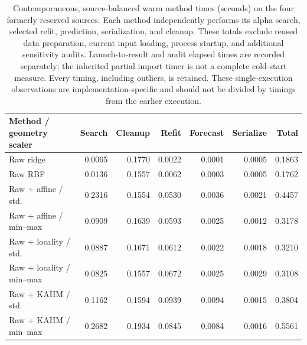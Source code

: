 \begin{table}[!htbp]
\centering
\scriptsize
\begin{tabular}{lrrrrrr}
\toprule
Method / geometry scaler & Search & Cleanup & Refit & Forecast & Serialize & Total \\
\midrule
Raw ridge & 0.0065 & 0.1770 & 0.0022 & 0.0001 & 0.0005 & 0.1863 \\
Raw RBF & 0.0136 & 0.1557 & 0.0062 & 0.0003 & 0.0005 & 0.1762 \\
Raw + affine / std. & 0.2316 & 0.1554 & 0.0530 & 0.0036 & 0.0021 & 0.4457 \\
Raw + affine / min--max & 0.0909 & 0.1639 & 0.0593 & 0.0025 & 0.0012 & 0.3178 \\
Raw + locality / std. & 0.0887 & 0.1671 & 0.0612 & 0.0022 & 0.0018 & 0.3210 \\
Raw + locality / min--max & 0.0825 & 0.1557 & 0.0672 & 0.0025 & 0.0029 & 0.3108 \\
Raw + KAHM / std. & 0.1162 & 0.1594 & 0.0939 & 0.0094 & 0.0015 & 0.3804 \\
Raw + KAHM / min--max & 0.2682 & 0.1934 & 0.0845 & 0.0084 & 0.0016 & 0.5561 \\
\bottomrule
\end{tabular}
\caption{Contemporaneous, source-balanced warm method times (seconds) on the four formerly reserved sources. Each method independently performs its alpha search, selected refit, prediction, serialization, and cleanup. These totals exclude reused data preparation, current input loading, process startup, and additional sensitivity audits. Launch-to-result and audit elapsed times are recorded separately; the inherited partial import timer is not a complete cold-start measure. Every timing, including outliers, is retained. These single-execution observations are implementation-specific and should not be divided by timings from the earlier execution.}
\label{tab:scaling-costs}
\end{table}
